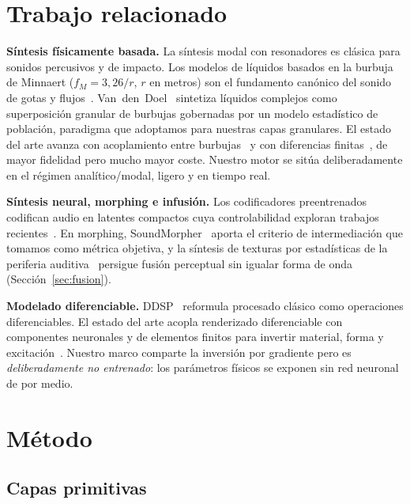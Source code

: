 \documentclass[a4paper,11pt,twoside]{article}
\begin{document}
\section{Trabajo relacionado}

\textbf{Síntesis físicamente basada.} La síntesis modal con resonadores es clásica para sonidos percusivos y de impacto. Los modelos de líquidos basados en la burbuja de Minnaert ($f_M = 3{,}26/r$, $r$ en metros) son el fundamento canónico del sonido de gotas y flujos~\cite{minnaert1933,vandendoel2005physically}. Van~den~Doel~\cite{vandendoel2005physically} sintetiza líquidos complejos como superposición granular de burbujas gobernadas por un modelo estadístico de población, paradigma que adoptamos para nuestras capas granulares. El estado del arte avanza con acoplamiento entre burbujas~\cite{xue2023coupled} y con diferencias finitas~\cite{bilbao2009numerical}, de mayor fidelidad pero mucho mayor coste. Nuestro motor se sitúa deliberadamente en el régimen analítico/modal, ligero y en tiempo real.

\textbf{Síntesis neural, morphing e infusión.} Los codificadores preentrenados codifican audio en latentes compactos cuya controlabilidad exploran trabajos recientes~\cite{zong2025learning}. En morphing, SoundMorpher~\cite{niu2024soundmorpher} aporta el criterio de intermediación que tomamos como métrica objetiva, y la síntesis de texturas por estadísticas de la periferia auditiva~\cite{mcdermott2011texture} persigue fusión perceptual sin igualar forma de onda (Sección~\ref{sec:fusion}).

\textbf{Modelado diferenciable.} DDSP~\cite{engel2020ddsp} reformula procesado clásico como operaciones diferenciables. El estado del arte acopla renderizado diferenciable con componentes neuronales y de elementos finitos para invertir material, forma y excitación~\cite{jin2024diffsound}. Nuestro marco comparte la inversión por gradiente pero es \emph{deliberadamente no entrenado}: los parámetros físicos se exponen sin red neuronal de por medio.

\section{Método}

\subsection{Capas primitivas}
\end{document}
